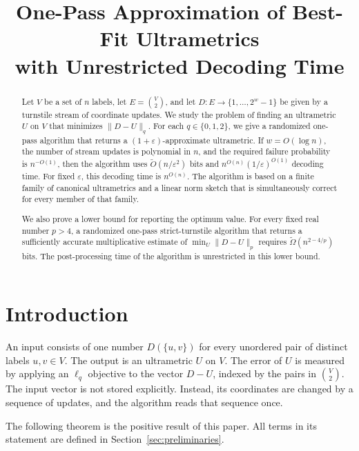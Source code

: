 \documentclass[11pt]{article}
\title{One-Pass Approximation of Best-Fit Ultrametrics\\
with Unrestricted Decoding Time}
\author{}
\date{}
\theoremstyle{definition}
\begin{document}
\maketitle

\begin{abstract}
Let \(V\) be a set of \(n\) labels, let \(E=\binom{V}{2}\), and let
\(D:E\to\{1,\ldots,2^w-1\}\) be given by a turnstile stream of coordinate
updates.  We study the problem of finding an ultrametric \(U\) on \(V\) that
minimizes \(\lVert D-U\rVert_q\).  For each \(q\in\{0,1,2\}\), we give a
randomized one-pass algorithm that returns a \((1+\varepsilon)\)-approximate
ultrametric.  If \(w=O(\log n)\), the number of stream updates is polynomial in
\(n\), and the required failure probability is \(n^{-O(1)}\), then the
algorithm uses \(\widetilde O(n/\varepsilon^2)\) bits and
\(n^{O(n)}(1/\varepsilon)^{O(1)}\) decoding time.  For fixed
\(\varepsilon\), this decoding time is \(n^{O(n)}\).  The algorithm is based
on a finite family of
canonical ultrametrics and a linear norm sketch that is simultaneously correct
for every member of that family.

We also prove a lower bound for reporting the optimum value.  For every fixed
real number \(p>4\), a randomized one-pass strict-turnstile algorithm that
returns a sufficiently accurate multiplicative estimate of
\(\min_U\lVert D-U\rVert_p\) requires
\(\widetilde\Omega(n^{2-4/p})\) bits.  The post-processing time of the
algorithm is unrestricted in this lower bound.
\end{abstract}

\section{Introduction}

An input consists of one number \(D(\{u,v\})\) for every unordered pair of
distinct labels \(u,v\in V\).  The output is an ultrametric \(U\) on \(V\).
The error of \(U\) is measured by applying an \(\ell_q\) objective to the
vector \(D-U\), indexed by the pairs in \(\binom{V}{2}\).  The input vector is
not stored explicitly.  Instead, its coordinates are changed by a sequence of
updates, and the algorithm reads that sequence once.

The following theorem is the positive result of this paper.  All terms in its
statement are defined in Section~\ref{sec:preliminaries}.
\end{document}
